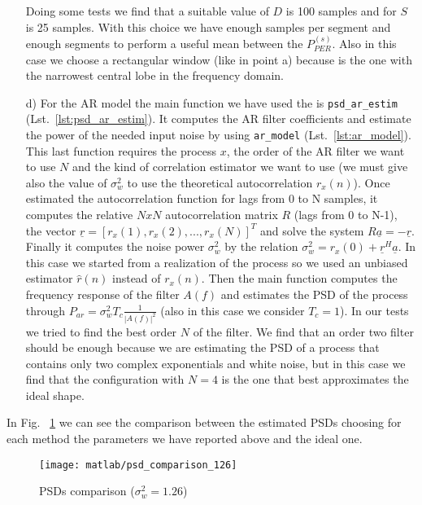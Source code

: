 \documentclass{article}
\newcommand{\inlinecode}[1]{\lstinline[basicstyle=\ttfamily,
    keywordstyle={},
    stringstyle={},
    commentstyle={\itshape}]{#1}}
\renewcommand{\vec}[1]{\underline{#1}}
\begin{document}
\begin{itemize}
\newline Doing some tests we find that a suitable value of $D$ is 100 samples and for $S$ is 25 samples. With this choice we have enough samples per segment and enough segments to perform a useful mean between the $P_{PER}^{(s)}$.
\newline Also in this case we choose a rectangular window (like in point a) because is the one with the narrowest central lobe in the frequency domain.
\item[d)]For the AR model the main function we have used the is \inlinecode{psd_ar_estim} (Lst.~\ref{lst:psd_ar_estim}). It computes the AR filter coefficients  and estimate the power of the needed input noise by using \inlinecode{ar_model} (Lst.~\ref{lst:ar_model}). This last function requires the process $x$, the order of the AR filter we want to use $N$ and the kind of correlation estimator we want to use (we must give also the value of $\sigma_w^2$ to use the theoretical autocorrelation $r_x (n)$). Once estimated the autocorrelation function for lags from 0 to N samples, it computes the relative $NxN$ autocorrelation matrix $R$ (lags from 0 to N-1), the vector $\vec{r} = [r_x (1), r_x (2), ...,r_x (N)]^T$ and solve the system $R \vec{a} = - \vec{r}$. Finally it computes the noise power $\sigma_w^2$ by the relation $\sigma_w^2 = r_x(0) + \vec{r}^H \vec{a}$. In this case we started from a realization of the process so we used an unbiased estimator $\hat{r}(n)$ instead of $r_x (n)$. 
\newline Then the main function computes the frequency response of the filter $A(f)$ and estimates the PSD of the process through $P_{ar} = \sigma_w^2 T_c \frac{1}{|A(f)|^2}$ (also in this case we consider $T_c=1$).
\newline In our tests we tried to find the best order $N$ of the filter. We find that an order two filter should be enough because we are estimating the PSD of a process that contains only two complex exponentials and white noise, but in this case we find that the configuration with $N = 4$  is the one that best approximates the ideal shape.
\end{itemize}
In Fig. ~\ref{plot:psd_comparison_126} we can see the comparison between the estimated PSDs choosing for each method the parameters we have reported above and the ideal one.
\begin{figure}[htbp]
  \centering
  \texttt{[image: matlab/psd\_comparison\_126]}
  \caption{PSDs comparison ($\sigma_w^2 = 1.26$)}
    \label{plot:psd_comparison_126}
\end{figure}
\end{document}
